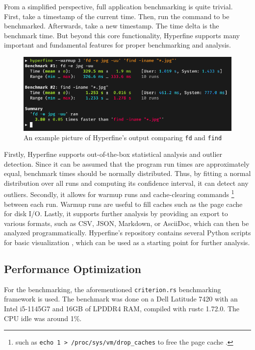 From a simplified perspective, full application benchmarking is quite trivial. First, take a timestamp of the current time. Then, run the command to be benchmarked. Afterwards, take a new timestamp. The time delta is the benchmark time. But beyond this core functionality, Hyperfine supports many important and fundamental features for proper benchmarking and analysis.\\

\begin{figure}[H]
  \centering
  \includegraphics[width=\textwidth]{./assets/hyperfine.png}
  \caption{An example picture of Hyperfine's output comparing \texttt{fd} and \texttt{find} \cite{hyperfine}}
\end{figure}

Firstly, Hyperfine supports out-of-the-box statistical analysis and outlier detection. Since it can be assumed that the program run times are approximately equal, benchmark times should be normally distributed. Thus, by fitting a normal distribution over all runs and computing its confidence interval, it can detect any outliers. Secondly, it allows for warmup runs and cache-clearing commands \footnote{such as \texttt{echo 1 > /proc/sys/vm/drop\_caches} to free the page cache \cite{kernel}.} between each run. Warmup runs are useful to fill caches such as the page cache for disk I/O. Lastly, it supports further analysis by providing an export to various formats, such as CSV, JSON, Markdown, or AsciiDoc, which can then be analyzed programmatically. Hyperfine's repository contains several Python scripts for basic visualization \cite{hyperfinescripts}, which can be used as a starting point for further analysis.

\subsection{Performance Optimization}
For the benchmarking, the aforementioned \texttt{criterion.rs} benchmarking framework is used. The benchmark was done on a Dell Latitude 7420 with an Intel i5-1145G7 and 16GB of LPDDR4 RAM, compiled with rustc 1.72.0. The CPU idle was around 1\%.

